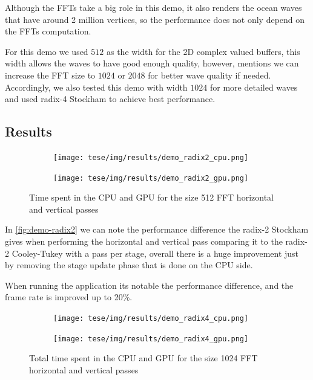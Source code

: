 \documentclass[
  oneside,
  11pt, a4paper,
  footinclude=true,
  headinclude=true,
  cleardoublepage=empty
]{scrbook}
\begin{document}
Although the FFTs take a big role in this demo, it also renders the ocean waves that have around 2 million vertices, so the performance does not only depend on the FFTs computation.
\newline

For this demo we used $512$ as the width for the 2D complex valued buffers, this width allows the waves to have good enough quality, however, \cite{tessendorf2001simulating} mentions we can increase the FFT size to $1024$ or $2048$ for better wave quality if needed. Accordingly, we also tested this demo with width $1024$ for more detailed waves and used radix-4 Stockham to achieve best performance.


\subsection{Results} \label{subsec:results}

\begin{figure}[H] 
    \begin{subfigure}{.5\textwidth}
        \centering
        \texttt{[image: tese/img/results/demo\_radix2\_cpu.png]}
    \end{subfigure}
    \begin{subfigure}{.5\textwidth}
        \centering
        \texttt{[image: tese/img/results/demo\_radix2\_gpu.png]}
    \end{subfigure}
    \caption{Time spent in the CPU and GPU for the size 512 FFT horizontal and vertical passes}
    \label{fig:demo-radix2}
\end{figure}

In \autoref{fig:demo-radix2} we can note the performance difference the radix-2 Stockham gives when performing the horizontal and vertical pass comparing it to the radix-2 Cooley-Tukey with a pass per stage, overall there is a huge improvement just by removing the stage update phase that is done on the CPU side.

When running the application its notable the performance difference, and the frame rate is improved up to 20\%.


\begin{figure}[H] 
    \begin{subfigure}{.5\textwidth}
        \centering
        \texttt{[image: tese/img/results/demo\_radix4\_cpu.png]}
    \end{subfigure}
    \begin{subfigure}{.5\textwidth}
        \centering
        \texttt{[image: tese/img/results/demo\_radix4\_gpu.png]}
    \end{subfigure}
    \caption{Total time spent in the CPU and GPU for the size 1024 FFT horizontal and vertical passes}
    \label{fig:demo-radix4}
\end{figure}
\end{document}

